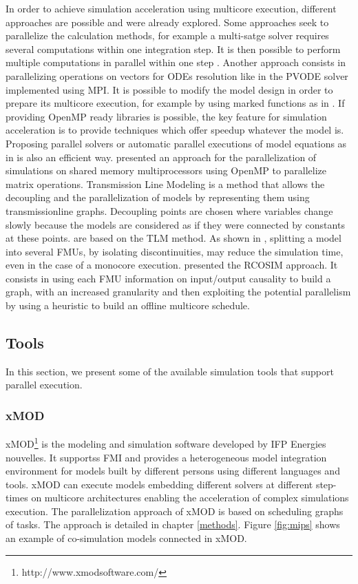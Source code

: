 In order to achieve simulation acceleration using multicore execution, different approaches are possible and were already explored. Some approaches seek to parallelize the calculation methods, for example a multi-satge solver requires several computations within one integration step. It is then possible to perform multiple computations in parallel within one step \cite{iserles:1990}. Another approach consists in parallelizing operations on vectors for ODEs resolution like in the PVODE solver \cite{byrne:1999} implemented using MPI. It is possible to modify the model design in order to prepare its multicore execution, for example by using marked functions as in \cite{elmqvist:2015,Gebremedhin2012}. If providing OpenMP ready libraries is possible, the key feature for simulation acceleration is to provide techniques which offer speedup whatever the model is. Proposing parallel solvers or automatic parallel executions of model equations as in \cite{elmqvist:2014} is also an efficient way. \cite{clauberg:2012} presented an approach for the parallelization of simulations on shared memory multiprocessors using OpenMP to parallelize matrix operations. Transmission Line Modeling \cite{hui:1990} is a method that allows the decoupling and the parallelization of models by representing them using transmissionline graphs. Decoupling points are chosen where variables change slowly because the models are considered as if they were connected by constants at these points. \cite{sjolund:2010,braun:2012} are based on the TLM method. As shown in \cite{Benkhaled_A_2012_ECOSM}, splitting a model into several FMUs, by isolating discontinuities, may reduce the simulation time, even in the case of a monocore execution. \cite{benkhaled:2014} presented the RCOSIM approach. It consists in using each FMU information on input/output causality to build a graph, with an increased granularity and then exploiting the potential parallelism by using a heuristic to build an offline multicore schedule.

\subsection{Tools}

In this section, we present some of the available simulation tools that support parallel execution.

\subsubsection{xMOD}
xMOD\footnote{http://www.xmodsoftware.com/} is the modeling and simulation software developed by IFP Energies nouvelles. It supportss FMI and provides a heterogeneous model integration environment for models built by different persons using different languages and tools. xMOD can execute models embedding different solvers at different step-times on multicore architectures enabling the acceleration of complex simulations execution. The parallelization approach of xMOD is based on scheduling graphs of tasks. The approach is detailed in chapter \ref{methods}. Figure \ref{fig:mips} shows an example of co-simulation models connected in xMOD. 

